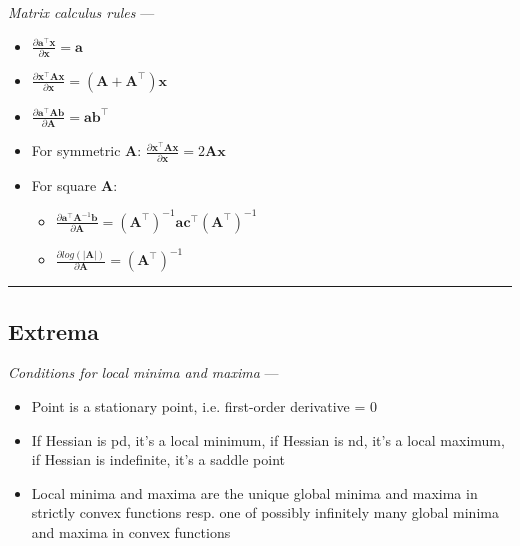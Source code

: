 \emph{Matrix calculus rules} --- 
\begin{multicols}{2}
\begin{itemize}
    \item $\frac{\partial \boldsymbol{a}^\intercal\boldsymbol{x}}{\partial \boldsymbol{x}} = \boldsymbol{a}$
    \item $\frac{\partial \boldsymbol{x}^\intercal\boldsymbol{A}\boldsymbol{x}}{\partial \boldsymbol{x}} = (\boldsymbol{A} + \boldsymbol{A}^\intercal)\boldsymbol{x}$
    \item $\frac{\partial \boldsymbol{a}^\intercal\boldsymbol{A}\boldsymbol{b}}{\partial \boldsymbol{A}} = \boldsymbol{a}\boldsymbol{b}^\intercal$
    \item For symmetric $\boldsymbol{A}$: $\frac{\partial \boldsymbol{x}^\intercal\boldsymbol{A}\boldsymbol{x}}{\partial \boldsymbol{x}} = 2\boldsymbol{A}\boldsymbol{x}$
    \item For square $\boldsymbol{A}$: 
    \begin{itemize}
        \item $\frac{\partial \boldsymbol{a}^\intercal\boldsymbol{A}^{-1}\boldsymbol{b}}{\partial \boldsymbol{A}} = (\boldsymbol{A}^\intercal)^{-1} \boldsymbol{a}\boldsymbol{c}^\intercal (\boldsymbol{A}^\intercal)^{-1}$
        \item $\frac{\partial log(|\boldsymbol{A}|)}{\partial \boldsymbol{A}} = (\boldsymbol{A}^\intercal)^{-1}$
    \end{itemize}
\end{itemize}
\end{multicols}

{\color{black}\hrule height 0.001mm}

\subsection*{Extrema}
\emph{Conditions for local minima and maxima} --- 
\begin{itemize}
    \item Point is a stationary point, i.e. first-order derivative = 0
    \item If Hessian is pd, it's a local minimum, if Hessian is nd, it's a local maximum, if Hessian is indefinite, it's a saddle point
    \item Local minima and maxima are the unique global minima and maxima in strictly convex functions resp. one of possibly infinitely many global minima and maxima in convex functions
\end{itemize}

